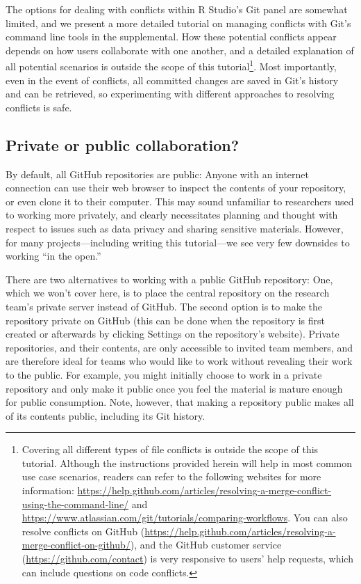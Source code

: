\documentclass[
  american,
  ,doc,floatsintext]{apa6}
\begin{document}
The options for dealing with conflicts within R Studio's Git panel are somewhat limited, and we present a more detailed tutorial on managing conflicts with Git's command line tools in the supplemental. How these potential conflicts appear depends on how users collaborate with one another, and a detailed explanation of all potential scenarios is outside the scope of this tutorial\footnote{Covering all different types of file conflicts is outside the scope of this tutorial. Although the instructions provided herein will help in most common use case scenarios, readers can refer to the following websites for more information: \url{https://help.github.com/articles/resolving-a-merge-conflict-using-the-command-line/} and \url{https://www.atlassian.com/git/tutorials/comparing-workflows}. You can also resolve conflicts on GitHub (\url{https://help.github.com/articles/resolving-a-merge-conflict-on-github/}), and the GitHub customer service (\url{https://github.com/contact}) is very responsive to users' help requests, which can include questions on code conflicts.}. Most importantly, even in the event of conflicts, all committed changes are saved in Git's history and can be retrieved, so experimenting with different approaches to resolving conflicts is safe.

\hypertarget{private-or-public-collaboration}{%
\subsection{Private or public collaboration?}\label{private-or-public-collaboration}}

By default, all GitHub repositories are public: Anyone with an internet connection can use their web browser to inspect the contents of your repository, or even clone it to their computer. This may sound unfamiliar to researchers used to working more privately, and clearly necessitates planning and thought with respect to issues such as data privacy and sharing sensitive materials. However, for many projects---including writing this tutorial---we see very few downsides to working ``in the open.''

There are two alternatives to working with a public GitHub repository: One, which we won't cover here, is to place the central repository on the research team's private server instead of GitHub. The second option is to make the repository private on GitHub (this can be done when the repository is first created or afterwards by clicking Settings on the repository's website). Private repositories, and their contents, are only accessible to invited team members, and are therefore ideal for teams who would like to work without revealing their work to the public. For example, you might initially choose to work in a private repository and only make it public once you feel the material is mature enough for public consumption. Note, however, that making a repository public makes all of its contents public, including its Git history.
\end{document}
